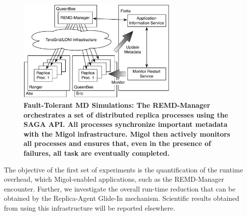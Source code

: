 \documentclass{rspublic}
\newcommand{\glidein}[1]{Glide-In }
\newcommand{\replicaagent}[1]{Replica-Agent }
\begin{document}
\begin{figure}[t]
    \centering
        \includegraphics[width=0.7\textwidth]{saga-taskfarming}
        \caption{\footnotesize \bf Fault-Tolerant MD Simulations: The
          REMD-Manager orchestrates a set of distributed replica
          processes using the SAGA API. All processes synchronize
          important metadata with the Migol infrastructure. Migol then
          actively monitors all processes and ensures that, even in
          the presence of failures, all task are eventually
          completed.}
    \label{fig:saga-taskfarming}
\end{figure} 
The objective of the first set of experiments is the
quantification of the runtime overhead, which Migol-enabled
applications, such as the REMD-Manager encounter.  Further, we investigate the 
overall run-time reduction that can be obtained by the \replicaagent\ \glidein\
mechanism. Scientific results obtained from using this infrastructure will be reported elsewhere.
\end{document}

